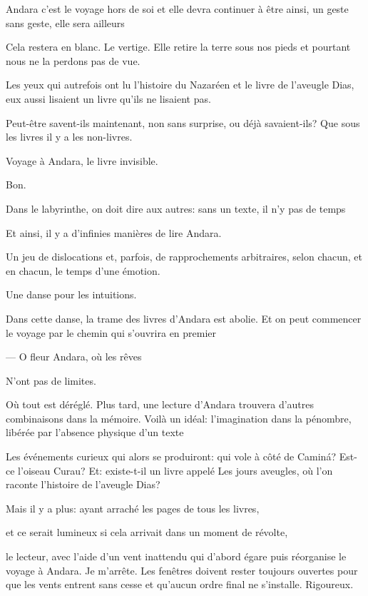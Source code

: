 Andara c'est le voyage hors de soi et elle devra continuer à être ainsi,
un geste sans geste, elle sera ailleurs

Cela restera en blanc. Le vertige. Elle retire la terre sous nos pieds
et pourtant nous ne la perdons pas de vue.

Les yeux qui autrefois ont lu l'histoire du Nazaréen et le livre de
l'aveugle Dias, eux aussi lisaient un livre qu'ils ne lisaient pas.

Peut-être savent-ils maintenant, non sans surprise, ou déjà
savaient-ils? Que sous les livres il y a les non-livres.

Voyage à Andara, le livre invisible.

\breakk

\vspace*{4cm}

Bon.

Dans le labyrinthe, on doit dire aux autres: sans un texte, il n'y pas
de temps

Et ainsi, il y a d'infinies manières de lire Andara.

Un jeu de dislocations et, parfois, de rapprochements arbitraires, selon
chacun, et en chacun, le temps d'une émotion.

Une danse pour les intuitions.

\breakk

\vspace*{4cm}

Dans cette danse, la trame des livres d'Andara est abolie. Et on peut
commencer le voyage par le chemin qui s'ouvrira en premier

--- O fleur Andara, où les rêves

N'ont pas de limites.

Où tout est déréglé. Plus tard, une lecture d'Andara trouvera d'autres
combinaisons dans la mémoire. Voilà un idéal: l'imagination dans la
pénombre, libérée par l'absence physique d'un texte

Les événements curieux qui alors se produiront: qui vole à côté de
Caminá? Est-ce l'oiseau Curau? Et: existe-t-il un livre appelé Les
jours aveugles, où l'on raconte l'histoire de l'aveugle Dias?

Mais il y a plus: ayant arraché les pages de tous les livres,

et ce serait lumineux si cela arrivait dans un moment de révolte,

le lecteur, avec l'aide d'un vent inattendu qui d'abord égare puis
réorganise le voyage à Andara. Je m'arrête. Les fenêtres doivent rester
toujours ouvertes pour que les vents entrent sans cesse et qu'aucun
ordre final ne s'installe. Rigoureux.


